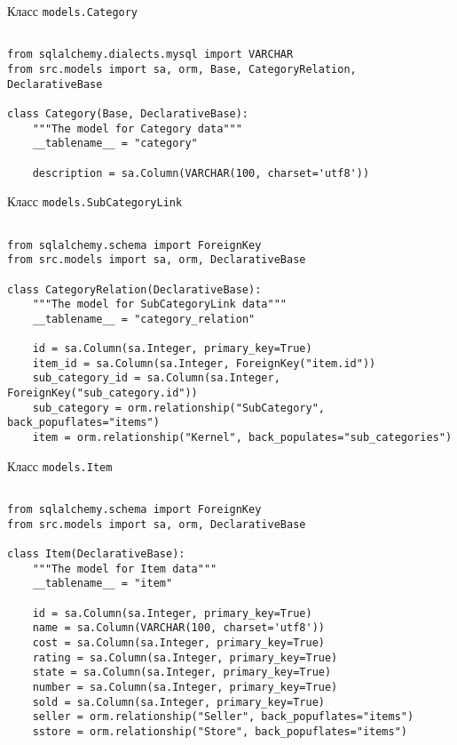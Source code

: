 \begin{center}Класс \texttt{models.Category}\end{center}

\begin{lstlisting}[style=app]

from sqlalchemy.dialects.mysql import VARCHAR
from src.models import sa, orm, Base, CategoryRelation, DeclarativeBase

class Category(Base, DeclarativeBase):
    """The model for Category data"""
    __tablename__ = "category"

    description = sa.Column(VARCHAR(100, charset='utf8'))

\end{lstlisting}

\begin{center}Класс \texttt{models.SubCategoryLink}\end{center}

\begin{lstlisting}[style=app]

from sqlalchemy.schema import ForeignKey
from src.models import sa, orm, DeclarativeBase

class CategoryRelation(DeclarativeBase):
    """The model for SubCategoryLink data"""
    __tablename__ = "category_relation"

    id = sa.Column(sa.Integer, primary_key=True)
    item_id = sa.Column(sa.Integer, ForeignKey("item.id"))
    sub_category_id = sa.Column(sa.Integer, ForeignKey("sub_category.id"))
    sub_category = orm.relationship("SubCategory", back_popuflates="items")
    item = orm.relationship("Kernel", back_populates="sub_categories")

\end{lstlisting}

\begin{center}Класс \texttt{models.Item}\end{center}

\begin{lstlisting}[style=app]

from sqlalchemy.schema import ForeignKey
from src.models import sa, orm, DeclarativeBase

class Item(DeclarativeBase):
    """The model for Item data"""
    __tablename__ = "item"

    id = sa.Column(sa.Integer, primary_key=True)
    name = sa.Column(VARCHAR(100, charset='utf8'))
    cost = sa.Column(sa.Integer, primary_key=True)
    rating = sa.Column(sa.Integer, primary_key=True)
    state = sa.Column(sa.Integer, primary_key=True)
    number = sa.Column(sa.Integer, primary_key=True)
    sold = sa.Column(sa.Integer, primary_key=True)
    seller = orm.relationship("Seller", back_popuflates="items")
    sstore = orm.relationship("Store", back_popuflates="items")

\end{lstlisting}


